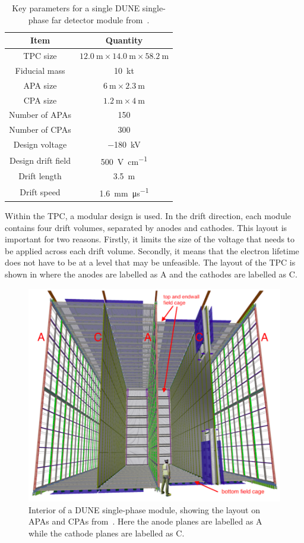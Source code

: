 \begin{table}
  \caption[Key parameters for a single DUNE single-phase far detector module.]{Key parameters for a single DUNE single-phase far detector module from~\cite{tdrVol4}.}
  \label{tab:spStats}
  \centering
  \begin{tabular}{c c}
    \hline
    \hline
    Item & Quantity \\
    \hline
    TPC size & $\SI{12.0}{\metre} \times \SI{14.0}{\metre} \times \SI{58.2}{\metre}$ \\
    Fiducial mass & \SI{10}{\kilo\tonne} \\
    APA size & $\SI{6}{\metre} \times \SI{2.3}{\metre}$ \\
    CPA size & $\SI{1.2}{\metre} \times \SI{4}{\metre}$ \\
    Number of APAs & 150 \\
    Number of CPAs & 300 \\
    Design voltage & \SI{-180}{\kilo\volt} \\
    Design drift field & \SI{500}{\volt\per\centi\metre} \\
    Drift length & \SI{3.5}{\metre} \\
    Drift speed & \SI{1.6}{\milli\metre\per\micro\second} \\
    \hline
  \end{tabular}
\end{table}

Within the TPC, a modular design is used.
In the drift direction, each module contains four drift volumes, separated by anodes and cathodes.
This layout is important for two reasons.
Firstly, it limits the size of the voltage that needs to be applied across each drift volume.
Secondly, it means that the electron lifetime does not have to be at a level that may be unfeasible.
The layout of the TPC is shown in  where the anodes are labelled as A and the cathodes are labelled as C. 

\begin{figure}[h]
  \centering
  \includegraphics[width=.6\linewidth]{files/figures/dune_detector/tpcInterior}
  \caption[Interior of a DUNE single-phase module, showing the layout on APAs and CPAs.]{Interior of a DUNE single-phase module, showing the layout on APAs and CPAs from~\cite{tdrVol4}. Here the anode planes are labelled as A while the cathode planes are labelled as C.}
  \label{fig:tpcInterior}
\end{figure}

